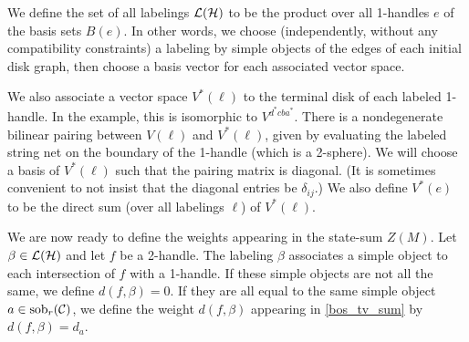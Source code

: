 We define the set of all labelings $\mathcal{L}(\mathcal{H})$ to be the product over all 1-handles $e$ of the basis sets $B(e)$.
In other words, we choose (independently, without any compatibility constraints) a labeling by simple objects of the edges of each initial
disk graph, then choose a basis vector for each associated vector space.

We also associate a vector space $V^*(\ell)$ to the terminal disk of each labeled 1-handle.
In the example, this is isomorphic to $V^{d^*cba^*}$.
There is a nondegenerate bilinear pairing between $V(\ell)$ and $V^*(\ell)$, 
given by evaluating the labeled string net on the boundary of the 1-handle (which is a 2-sphere).
We will choose a basis of $V^*(\ell)$ such that the pairing matrix is diagonal.
(It is sometimes convenient to not insist that the diagonal entries be $\delta_{ij}$.)
We also define $V^*(e)$ to be the direct sum (over all labelings $\ell$) of $V^*(\ell)$.

We are now ready to define the weights appearing in the state-sum $Z(M)$. 
Let $\beta\in\mathcal{L}(\mathcal{H})$ and let $f$ be a 2-handle.
The labeling $\beta$ associates a simple object to each intersection of $f$ with a 1-handle.
If these simple objects are not all the same, we define $d(f, \beta) = 0$.
If they are all equal to the same simple object $a\in\text{sob}_r(\mathcal{C})$, we define the weight $d(f, \beta)$
appearing in \eqref{bos_tv_sum} by $d(f,\beta) = d_a$.

